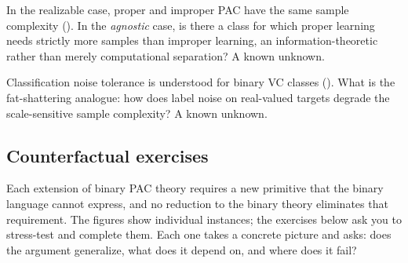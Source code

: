 \begin{openprob}
\label{open:agnostic-proper}
In the realizable case, proper and improper PAC have the same sample
complexity ().  In the \emph{agnostic} case, is there
a class for which proper learning needs strictly more samples than improper
learning, an information-theoretic rather than merely computational separation?  A
known unknown.
\end{openprob}

\begin{openprob}
\label{open:noise-fat}
Classification noise tolerance is understood for binary VC classes
().  What is the fat-shattering analogue: how does
label noise on real-valued targets degrade the scale-sensitive sample
complexity?  A known unknown.
\end{openprob}

\subsection*{Counterfactual exercises}

Each extension of binary PAC theory requires a new primitive that the binary
language cannot express, and no reduction to the binary theory eliminates that
requirement.  The figures show individual instances; the exercises below ask
you to stress-test and complete them.  Each one takes a concrete picture and
asks: does the argument generalize, what does it depend on, and where does it
fail?

